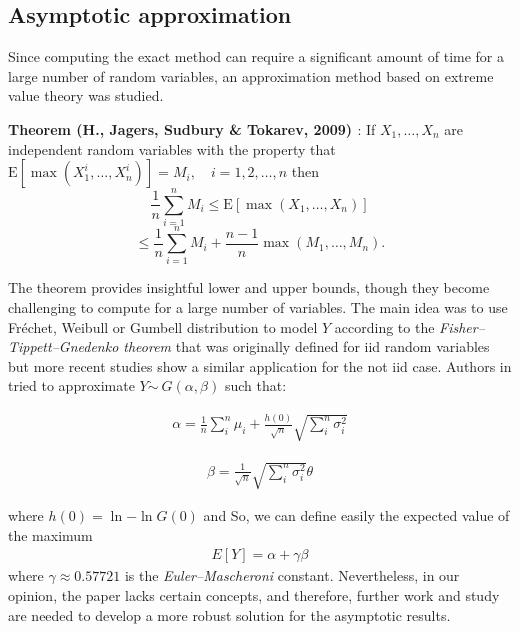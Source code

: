 \subsection{Asymptotic approximation}
Since computing the exact method can require a significant amount of time for a large number of random variables, an approximation method based on extreme value theory was studied.

\textbf{Theorem (H., Jagers, Sudbury \& Tokarev, 2009) \cite{hamza2009mixing}}: If \( X_1, \ldots, X_n \) are independent random variables with the property that  $\mathrm{E}[\max(X_1^i, \ldots, X_n^i)] = M_i, \quad i = 1, 2, \ldots, n$ then 
\[
\frac{1}{n} \sum_{i=1}^n M_i \leq \mathrm{E}[\max(X_1, \ldots, X_n)]
\]
\[
\leq \frac{1}{n} \sum_{i=1}^n M_i + \frac{n-1}{n} \max(M_1, \ldots, M_n).
\]

The theorem provides insightful lower and upper bounds, though they become challenging to compute for a large number of variables. The main idea was to use Fréchet, Weibull or Gumbell distribution to model $Y$ according to the \textit{Fisher–Tippett–Gnedenko theorem} \cite{fisher1928limiting} that was originally defined for iid random variables but more recent studies show a similar application for the not iid case. Authors in \cite{padua2013distribution} tried to approximate $Y \dot \sim \ G(\alpha, \beta)$ such that:

\begin{align*}
	\alpha = \frac{1}{n} \sum_{i}^n{\mu_i} + \frac{h(0)}{\sqrt{n}} \sqrt{\sum_{i}^n{\sigma_i^2}} 
\end{align*}

\begin{align*}
	\beta = \frac{1}{\sqrt{n}} \sqrt{\sum_{i}^n{\sigma_i^2}} \theta 	
\end{align*}

where $h(0) = \ln{-\ln{G(0)}}$ and 
So, we can define easily the expected value of the maximum
\begin{align*}
	E[Y] = \alpha + \gamma \beta
\end{align*}
where $\gamma \approx 0.57721$ is the \textit{Euler–Mascheroni} constant. Nevertheless, in our opinion, the paper lacks certain concepts, and therefore, further work and study are needed to develop a more robust solution for the asymptotic results.
